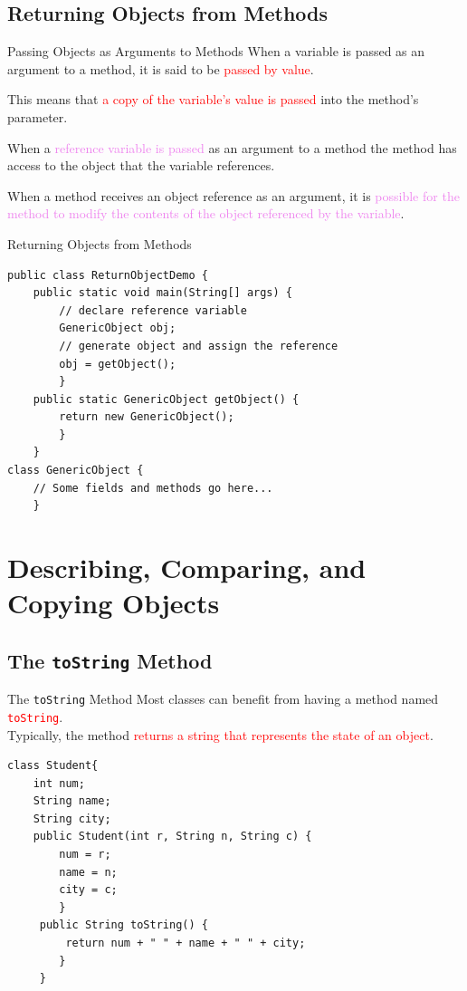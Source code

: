 \documentclass[11pt]{beamer}
\newcommand{\red}[1]{\textcolor{red}{#1}}
\newcommand{\violet}[1]{\textcolor{violet}{#1}}
\begin{document}
\subsection{Returning Objects from Methods}
\begin{frame}{Passing Objects as Arguments to Methods}
    When a variable is passed as an argument to a method, it is said to be \red{passed by value}. \\ \vspace{1em}
    
    This means that \red{a copy of the variable’s value is passed} into the method’s parameter. \\ \vspace{1em}
    
    When a \violet{reference variable is passed} as an argument to a method the method has access to the object that the variable references. \\ \vspace{1em}
    
    When a method receives an object reference as an argument, it is \violet{possible for the method to modify the contents of the object referenced by the variable}.
\end{frame}

\begin{frame}[fragile]{Returning Objects from Methods}
    \begin{lstlisting}
public class ReturnObjectDemo {
	public static void main(String[] args) {
		// declare reference variable
		GenericObject obj;
		// generate object and assign the reference
		obj = getObject();
		}
	public static GenericObject getObject() {
		return new GenericObject();
		}
	}
class GenericObject {
	// Some fields and methods go here...
	}

    \end{lstlisting}
\end{frame}

\section{Describing, Comparing, and Copying Objects}
\subsection{The \texttt{toString} Method}
\begin{frame}[fragile]{The \texttt{toString} Method}
    Most classes can benefit from having a method named \red{\texttt{toString}}. \\ \vspace{1em}
    Typically, the method \red{returns a string that represents the state of an object}.
    \begin{lstlisting}[basicstyle=\ttfamily\footnotesize]
class Student{
	int num;
	String name;
	String city;
	public Student(int r, String n, String c) {
		num = r;  
		name = n;
		city = c;
	 	}
	 public String toString() {
		 return num + " " + name + " " + city;  
	 	}
	 }        
    \end{lstlisting}
\end{frame}
\end{document}

